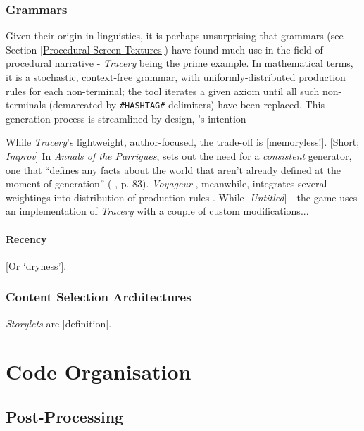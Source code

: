 \documentclass[a4paper, 11pt]{article}
\begin{document}
\begin{flushleft}
\subsubsection{Grammars}

Given their origin in linguistics, it is perhaps unsurprising that grammars (see Section \ref{Procedural Screen Textures}) have found much use in the field of procedural narrative - \textit{Tracery} \citep{comptonTracery} being the prime example. In mathematical terms, it is a stochastic, context-free grammar, with uniformly-distributed production rules for each non-terminal; the tool iterates a given axiom until all such non-terminals (demarcated by \texttt{\#HASHTAG\#} delimiters) have been replaced. This generation process is streamlined by design, \citeauthor{comptonTracery}'s intention 

\vspace{5pt}\noindent
While \textit{Tracery}'s lightweight, author-focused, the trade-off is [memoryless!]. [Short; \textit{Improv}] In \textit{Annals of the Parrigues}, sets out the need for a \textit{consistent} generator, one that ``defines any facts about the world that aren’t already defined at the moment of generation'' ( , p. 83). \textit{Voyageur} , meanwhile, integrates several weightings into distribution of production rules \citep{diasVoyageurDescriptions}. While [\textit{Untitled}] - the game uses an implementation of \textit{Tracery} with a couple of custom modifications...

\paragraph{Recency} [Or `dryness'].

\subsubsection{Content Selection Architectures} \textit{Storylets} \citep{kreminskiStorylets} are [definition].

\vspace{5pt}
 
\section{Code Organisation}


\subsection{Post-Processing}


\end{flushleft}
\end{document}
